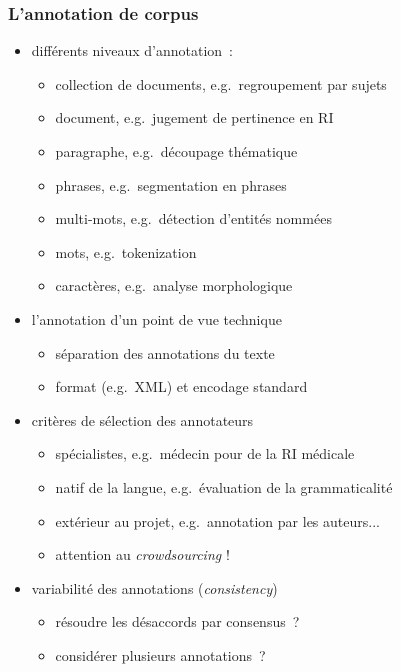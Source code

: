 \begin{frame}[allowframebreaks]
\frametitle{L'annotation de corpus}

\begin{itemize} \itemsep0.8em

    \item différents niveaux d'annotation~:
    \begin{itemize}
        \item collection de documents, e.g.~regroupement par sujets
        \item document, e.g.~jugement de pertinence en RI
        \item paragraphe, e.g.~découpage thématique
        \item phrases, e.g.~segmentation en phrases
        \item multi-mots, e.g.~détection d'entités nommées
        \item mots, e.g.~tokenization
        \item caractères, e.g.~analyse morphologique
    \end{itemize}

    \item l'annotation d'un point de vue technique
    \begin{itemize}
        \item séparation des annotations du texte
        \item format (e.g.~XML) et encodage standard
    \end{itemize}

     \framebreak

    \item critères de sélection des annotateurs
    \begin{itemize}
        \item spécialistes, e.g.~médecin pour de la RI médicale
        \item natif de la langue, e.g.~évaluation de la grammaticalité
        \item extérieur au projet, e.g.~annotation par les auteurs...
        \item attention au \alert{\textit{crowdsourcing}} !
    \end{itemize}

    \item variabilité des annotations (\textit{consistency})
    \begin{itemize}
        \item résoudre les désaccords par consensus~? 
        \item considérer plusieurs annotations~?
    \end{itemize}

\end{itemize}

\end{frame}

